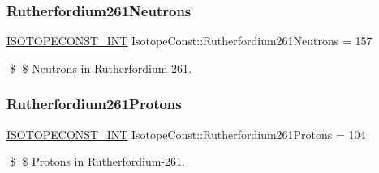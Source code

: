 \subsubsection{\texorpdfstring{Rutherfordium261\+Neutrons}{Rutherfordium261Neutrons}}
{\footnotesize\ttfamily \mbox{\hyperlink{group___isotope_const-_macros_ga5f18360b3e99483a35c32d789e62621c}{I\+S\+O\+T\+O\+P\+E\+C\+O\+N\+S\+T\+\_\+\+I\+NT}} Isotope\+Const\+::\+Rutherfordium261\+Neutrons = 157}

\$ \$ Neutrons in Rutherfordium-\/261. \mbox{\label{group___isotope_const-_rutherfordium-_rf261_ga05304b5405109c4969addb6f41c761db}} 
\subsubsection{\texorpdfstring{Rutherfordium261\+Protons}{Rutherfordium261Protons}}
{\footnotesize\ttfamily \mbox{\hyperlink{group___isotope_const-_macros_ga5f18360b3e99483a35c32d789e62621c}{I\+S\+O\+T\+O\+P\+E\+C\+O\+N\+S\+T\+\_\+\+I\+NT}} Isotope\+Const\+::\+Rutherfordium261\+Protons = 104}

\$ \$ Protons in Rutherfordium-\/261. 